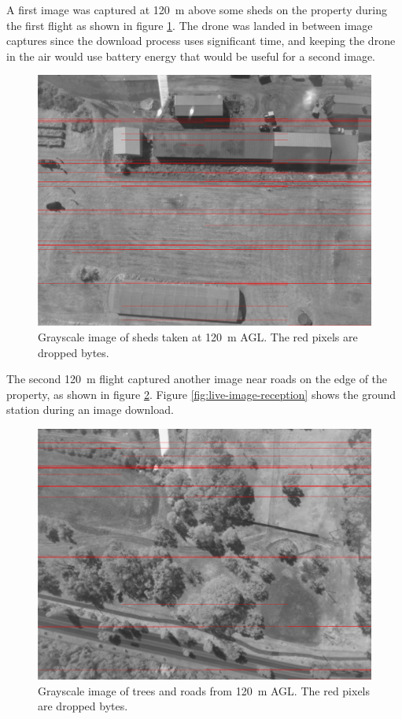 \documentclass{report}
\begin{document}
A first image was captured at \SI{120}{\metre} above some sheds on the property during the first flight as shown in figure \ref{fig:sheds-received}. The drone was landed in between image captures since the download process uses significant time, and keeping the drone in the air would use battery energy that would be useful for a second image.

\begin{figure}[H]
  \centering
  \includegraphics[width=\linewidth]{images/sheds_received.png}
  \caption{Grayscale image of sheds taken at \SI{120}{\metre} AGL. The red pixels are dropped bytes.}
  \label{fig:sheds-received}
\end{figure}

The second \SI{120}{\metre} flight captured another image near roads on the edge of the property, as shown in figure \ref{fig:road-received}. Figure \ref{fig:live-image-reception} shows the ground station during an image download.

\begin{figure}[H]
  \centering
  \includegraphics[width=\linewidth]{images/road_received.png}
  \caption{Grayscale image of trees and roads from \SI{120}{\metre} AGL. The red pixels are dropped bytes.}
  \label{fig:road-received}
\end{figure}
\end{document}
